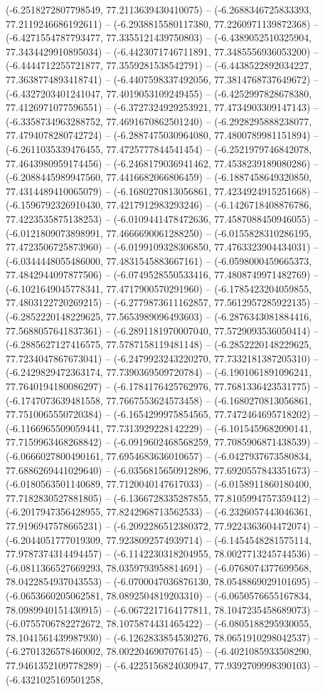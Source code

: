 (-6.2518272807798549, 77.2113639430410075) -- (-6.2688346725833393, 77.2119246686192611) -- (-6.2938815580117380, 77.2260971139872368) -- (-6.4271554787793477, 77.3355121439750803) -- (-6.4389052510325904, 77.3434429910895034) -- (-6.4423071746711891, 77.3485556936053200) -- (-6.4444712255721877, 77.3559281538542791) -- (-6.4438522892034227, 77.3638774893418741) -- (-6.4407598337492056, 77.3814768737649672) -- (-6.4327203401241047, 77.4019053109249455) -- (-6.4252997828678380, 77.4126971077596551) -- (-6.3727324929253921, 77.4734903309147143) -- (-6.3358734963288752, 77.4691670862501240) -- (-6.2928295888238077, 77.4794078280742724) -- (-6.2887475030964080, 77.4800789981151894) -- (-6.2611035339476455, 77.4725777844541454) -- (-6.2521979746842078, 77.4643980959174456) -- (-6.2468179036941462, 77.4538239189080286) -- (-6.2088445989947560, 77.4416682066806459) -- (-6.1887458649320850, 77.4314489410065079) -- (-6.1680270813056861, 77.4234924915251668) -- (-6.1596792326910430, 77.4217912983293246) -- (-6.1426718408876786, 77.4223535875138253) -- (-6.0109441478472636, 77.4587088450946055) -- (-6.0121809073898991, 77.4666690061288250) -- (-6.0155828310286195, 77.4723506725873960) -- (-6.0199109328306850, 77.4763323904434031) -- (-6.0344448055486000, 77.4831545883667161) -- (-6.0598000459665373, 77.4842944097877506) -- (-6.0749528550533416, 77.4808749971482769) -- (-6.1021649045778341, 77.4717900570291960) -- (-6.1785423204059855, 77.4803122720269215) -- (-6.2779873611162857, 77.5612957285922135) -- (-6.2852220148229625, 77.5653989096493603) -- (-6.2876343081884416, 77.5688057641837361) -- (-6.2891181970007040, 77.5729093536050414) -- (-6.2885627127416575, 77.5787158119481148) -- (-6.2852220148229625, 77.7234047867673041) -- (-6.2479923243220270, 77.7332181387205310) -- (-6.2429829472363174, 77.7390369509720784) -- (-6.1901061891096241, 77.7640194180086297) -- (-6.1784176425762976, 77.7681336423531775) -- (-6.1747073639481558, 77.7667553624573458) -- (-6.1680270813056861, 77.7510065550720384) -- (-6.1654299975854565, 77.7472464695718202) -- (-6.1166965509059441, 77.7313929228142229) -- (-6.1015459682090141, 77.7159963468268842) -- (-6.0919602468568259, 77.7085906871438539) -- (-6.0666027800490161, 77.6954683636010657) -- (-6.0427937673580834, 77.6886269441029640) -- (-6.0356815650912896, 77.6920557843351673) -- (-6.0180563501140689, 77.7120040147617033) -- (-6.0158911860180400, 77.7182830527881805) -- (-6.1366728335287855, 77.8105994757359412) -- (-6.2017947356428955, 77.8242968713562533) -- (-6.2326057443046361, 77.9196947578665231) -- (-6.2092286512380372, 77.9224363604472074) -- (-6.2044051777019309, 77.9238092574939714) -- (-6.1454548281575114, 77.9787374314494457) -- (-6.1142230318204955, 78.0027713245744536) -- (-6.0811366527669293, 78.0359793958814691) -- (-6.0768074377699568, 78.0422854937043553) -- (-6.0700047036876130, 78.0548869029101695) -- (-6.0653660205062581, 78.0892504819203310) -- (-6.0650576655167834, 78.0989940151430915) -- (-6.0672217164177811, 78.1047235458689073) -- (-6.0755706782272672, 78.1075874431465422) -- (-6.0805188295930055, 78.1041561439987930) -- (-6.1262833854530276, 78.0651910298042537) -- (-6.2701326578460002, 78.0022046907076145) -- (-6.4021085933508290, 77.9461352109778289) -- (-6.4225156824030947, 77.9392709998390103) -- (-6.4321025169501258, 